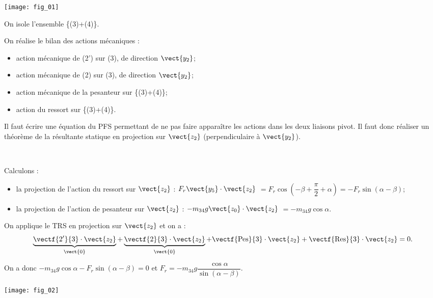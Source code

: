 \ifprof
\begin{corrige}
\begin{center}
\texttt{[image: fig\_01]}
\end{center}

On isole l'ensemble \{(3)+(4)\}. 

On réalise le bilan des actions mécaniques : 
\begin{itemize}
\item action mécanique de (2') sur (3), de direction $\vect{y_2}$;
\item action mécanique de (2) sur (3), de direction $\vect{y_2}$;
\item action mécanique de la pesanteur sur \{(3)+(4)\};
\item action du ressort sur \{(3)+(4)\}.
\end{itemize}

Il faut écrire une équation du PFS permettant de ne pas faire apparaître les actions dans les deux liaisons pivot. Il faut donc réaliser un théorème de la résultante statique en projection sur $\vect{z_2}$ (perpendiculaire à $\vect{y_2}$).

\end{corrige}
\else
\fi

\ifprof
\begin{corrige}~\\
\begin{minipage}[c]{.7\linewidth}
Calculons : 
\begin{itemize}
\item la projection de l'action du ressort sur $\vect{z_2}$ : $F_r \vect{y_5} \cdot\vect{z_2}$ $=F_r\cos\left(-\beta +\dfrac{\pi}{2}+\alpha\right)=-F_r\sin\left(\alpha-\beta \right)$;
\item la projection de l'action de pesanteur sur $\vect{z_2}$ : $-m_{34} g \vect{z_0} \cdot\vect{z_2}$ $=-m_{34} g\cos\alpha$.
\end{itemize}
On applique le TRS en projection sur $\vect{z_2}$ et on a  :
$$
\underbrace{\vectf{2'}{3}\cdot \vect{z_2}}_{\vect{0}}+\underbrace{\vectf{2}{3}\cdot \vect{z_2}}_{\vect{0}}+\vectf{\text{Pes}}{3}\cdot \vect{z_2}+\vectf{\text{Res}}{3}\cdot \vect{z_2}=0.
$$

On a donc $-m_{34} g\cos\alpha -F_r\sin\left(\alpha-\beta \right) = 0$ et  
$\boxed{F_r = -m_{34} g \dfrac{\cos\alpha}{\sin\left(\alpha-\beta \right)}}$.
\end{minipage}\hfill
\begin{minipage}[c]{.25\linewidth}
\texttt{[image: fig\_02]}
\end{minipage}

\end{corrige}
\else
\fi

